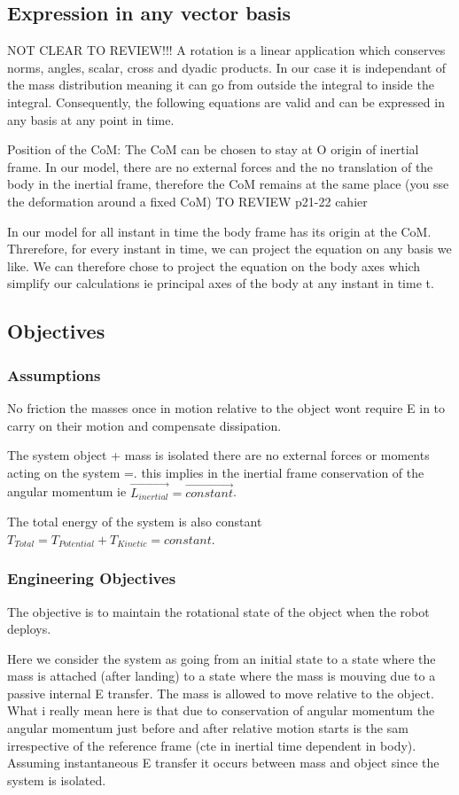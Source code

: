 \subsection{Expression in any vector basis}
NOT CLEAR TO REVIEW!!!
A rotation is a linear application which conserves norms, angles, scalar, cross and dyadic products. In our case it is independant of the mass distribution meaning it can go from outside the integral to inside the integral.
Consequently, the following equations are valid and can be expressed in any basis at any point in time.

Position of the CoM: The CoM can be chosen to stay at O origin of inertial frame. In our model, there are no external forces and the no translation of the body in the inertial frame, therefore the CoM remains at the same place (you sse the deformation around a fixed CoM) TO REVIEW p21-22 cahier

In our model for all instant in time the body frame has its origin at the CoM. Threrefore, for every instant in time, we can project the equation on any basis we like. We can therefore chose to project the equation on the body axes which simplify our calculations ie principal axes of the body at any instant in time t.

\subsection{Objectives}
\subsubsection{Assumptions}
No friction the masses once in motion relative to the object wont require E in to carry on their motion and compensate dissipation.

The system object + mass is isolated there are no external forces or moments acting on the system =. this implies in the inertial frame conservation of the angular momentum ie $\vec{L_{inertial}}=\vec{constant}$.

The total energy of the system is also constant $T_{Total}=T_{Potential}+T_{Kinetic}=constant$.

\subsubsection{Engineering Objectives}
The objective is to maintain the rotational state of the object when the robot deploys.

Here we consider the system as going from an initial state to a state where the mass is attached (after landing) to a state where the mass is mouving due to a passive internal E transfer. The mass is allowed to move relative to the object. What i really mean here is that due to conservation of angular momentum the angular momentum just before and after relative motion starts is the sam irrespective of the reference frame (cte in inertial time dependent in body). Assuming instantaneous E transfer it occurs between mass and object since the system is isolated.

